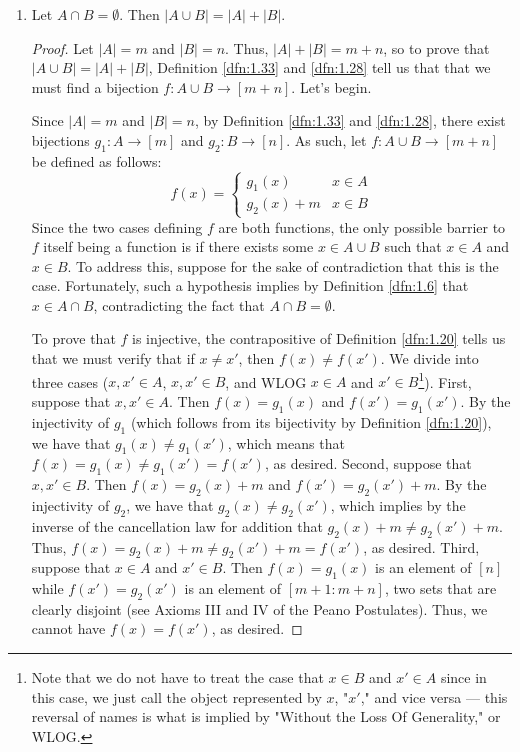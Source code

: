 \documentclass[../main.tex]{subfiles}
\begin{document}
\begin{exercise}
\begin{enumerate}[label={\alph*)}]
\begin{proof}
        \end{proof}
        \item Let $A\cap B=\emptyset$. Then $|A\cup B|=|A|+|B|$.
        \begin{proof}
            Let $|A|=m$ and $|B|=n$. Thus, $|A|+|B|=m+n$, so to prove that $|A\cup B|=|A|+|B|$, Definition \ref{dfn:1.33} and \ref{dfn:1.28} tell us that that we must find a bijection $f:A\cup B\to[m+n]$. Let's begin.\par
            Since $|A|=m$ and $|B|=n$, by Definition \ref{dfn:1.33} and \ref{dfn:1.28}, there exist bijections $g_1:A\to[m]$ and $g_2:B\to[n]$. As such, let $f:A\cup B\to[m+n]$ be defined as follows:
            \begin{equation*}
                f(x) =
                \begin{cases}
                    g_1(x) & x\in A\\
                    g_2(x)+m & x\in B
                \end{cases}
            \end{equation*}
            Since the two cases defining $f$ are both functions, the only possible barrier to $f$ itself being a function is if there exists some $x\in A\cup B$ such that $x\in A$ and $x\in B$. To address this, suppose for the sake of contradiction that this is the case. Fortunately, such a hypothesis implies by Definition \ref{dfn:1.6} that $x\in A\cap B$, contradicting the fact that $A\cap B=\emptyset$.\par
            To prove that $f$ is injective, the contrapositive of Definition \ref{dfn:1.20} tells us that we must verify that if $x\neq x'$, then $f(x)\neq f(x')$. We divide into three cases ($x,x'\in A$, $x,x'\in B$, and WLOG $x\in A$ and $x'\in B$\footnote{Note that we do not have to treat the case that $x\in B$ and $x'\in A$ since in this case, we just call the object represented by $x$, "$x'$," and vice versa --- this reversal of names is what is implied by "Without the Loss Of Generality," or WLOG.}). First, suppose that $x,x'\in A$. Then $f(x)=g_1(x)$ and $f(x')=g_1(x')$. By the injectivity of $g_1$ (which follows from its bijectivity by Definition \ref{dfn:1.20}), we have that $g_1(x)\neq g_1(x')$, which means that $f(x)=g_1(x)\neq g_1(x')=f(x')$, as desired. Second, suppose that $x,x'\in B$. Then $f(x)=g_2(x)+m$ and $f(x')=g_2(x')+m$. By the injectivity of $g_2$, we have that $g_2(x)\neq g_2(x')$, which implies by the inverse of the cancellation law for addition that $g_2(x)+m\neq g_2(x')+m$. Thus, $f(x)=g_2(x)+m\neq g_2(x')+m=f(x')$, as desired. Third, suppose that $x\in A$ and $x'\in B$. Then $f(x)=g_1(x)$ is an element of $[n]$ while $f(x')=g_2(x')$ is an element of $[m+1:m+n]$, two sets that are clearly disjoint (see Axioms III and IV of the Peano Postulates). Thus, we cannot have $f(x)=f(x')$, as desired.\par

\end{proof}
\end{enumerate}
\end{exercise}
\end{document}
